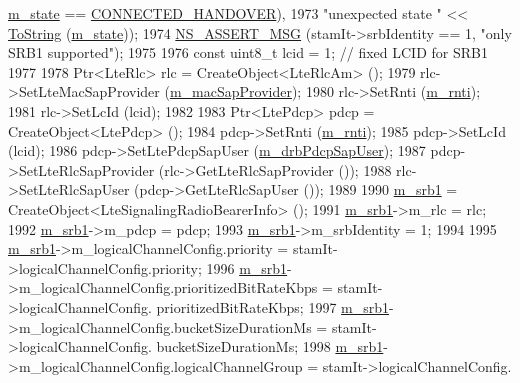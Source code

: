 \begin{DoxyCode}
      \hyperlink{classns3_1_1LteUeRrc_a81d711739d758a5add38b100086be632}{m\_state} == \hyperlink{classns3_1_1LteUeRrc_a241012c291e75681150c9214e11f6145a619fb36d614e3e051f981aa3d43a633c}{CONNECTED\_HANDOVER}), 
1973                          \textcolor{stringliteral}{"unexpected state "} << \hyperlink{namespacens3_a3d1f7e1bec1972e2ae8d64673fcfcd9c}{ToString} (\hyperlink{classns3_1_1LteUeRrc_a81d711739d758a5add38b100086be632}{m\_state}));
1974           \hyperlink{assert_8h_aff5ece9066c74e681e74999856f08539}{NS\_ASSERT\_MSG} (stamIt->srbIdentity == 1, \textcolor{stringliteral}{"only SRB1 supported"});
1975 
1976           \textcolor{keyword}{const} uint8\_t lcid = 1; \textcolor{comment}{// fixed LCID for SRB1}
1977 
1978           Ptr<LteRlc> rlc = CreateObject<LteRlcAm> ();
1979           rlc->SetLteMacSapProvider (\hyperlink{classns3_1_1LteUeRrc_a194a22ce682adab02b0e9d2fc71fda48}{m\_macSapProvider});
1980           rlc->SetRnti (\hyperlink{classns3_1_1LteUeRrc_a8e078d8ef0ad23e670fe2ef08caab84f}{m\_rnti});
1981           rlc->SetLcId (lcid);      
1982 
1983           Ptr<LtePdcp> pdcp = CreateObject<LtePdcp> ();
1984           pdcp->SetRnti (\hyperlink{classns3_1_1LteUeRrc_a8e078d8ef0ad23e670fe2ef08caab84f}{m\_rnti});
1985           pdcp->SetLcId (lcid);
1986           pdcp->SetLtePdcpSapUser (\hyperlink{classns3_1_1LteUeRrc_a6f2505a766e5a391d82170ebff83a9c2}{m\_drbPdcpSapUser});
1987           pdcp->SetLteRlcSapProvider (rlc->GetLteRlcSapProvider ());
1988           rlc->SetLteRlcSapUser (pdcp->GetLteRlcSapUser ());
1989 
1990           \hyperlink{classns3_1_1LteUeRrc_aeb8ad627a3df9126d146bacb6dc3dce6}{m\_srb1} = CreateObject<LteSignalingRadioBearerInfo> ();
1991           \hyperlink{classns3_1_1LteUeRrc_aeb8ad627a3df9126d146bacb6dc3dce6}{m\_srb1}->m\_rlc = rlc;
1992           \hyperlink{classns3_1_1LteUeRrc_aeb8ad627a3df9126d146bacb6dc3dce6}{m\_srb1}->m\_pdcp = pdcp;
1993           \hyperlink{classns3_1_1LteUeRrc_aeb8ad627a3df9126d146bacb6dc3dce6}{m\_srb1}->m\_srbIdentity = 1;
1994           
1995           \hyperlink{classns3_1_1LteUeRrc_aeb8ad627a3df9126d146bacb6dc3dce6}{m\_srb1}->m\_logicalChannelConfig.priority = stamIt->logicalChannelConfig.priority;
1996           \hyperlink{classns3_1_1LteUeRrc_aeb8ad627a3df9126d146bacb6dc3dce6}{m\_srb1}->m\_logicalChannelConfig.prioritizedBitRateKbps = stamIt->logicalChannelConfig.
      prioritizedBitRateKbps;
1997           \hyperlink{classns3_1_1LteUeRrc_aeb8ad627a3df9126d146bacb6dc3dce6}{m\_srb1}->m\_logicalChannelConfig.bucketSizeDurationMs = stamIt->logicalChannelConfig.
      bucketSizeDurationMs;
1998           \hyperlink{classns3_1_1LteUeRrc_aeb8ad627a3df9126d146bacb6dc3dce6}{m\_srb1}->m\_logicalChannelConfig.logicalChannelGroup = stamIt->logicalChannelConfig.

\end{DoxyCode}
